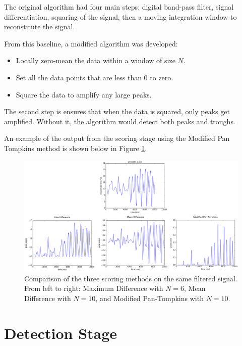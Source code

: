                 The original algorithm had four main steps: digital band-pass filter, signal differentiation, squaring of the signal, then a moving integration window to reconstitute the signal.

                From this baseline, a modified algorithm was developed:

                \begin{itemize}
                    \item Locally zero-mean the data within a window of size $N$.
                    \item Set all the data points that are less than 0 to zero.
                    \item Square the data to amplify any large peaks.
                \end{itemize}

                The second step is ensures that when the data is squared, only peaks get amplified. Without it, the algorithm would detect both peaks and troughs.

                An example of the output from the scoring stage using the Modified Pan Tompkins method is shown below in Figure \ref{img_compare_scoring}.

                \begin{figure}[!th]
                    \includegraphics[width=\textwidth]{Images/compare_scoring.png}
                    \centering
                    \caption{Comparison of the three scoring methods on the same filtered signal. From left to right: Maximum Difference with $N=6$, Mean Difference with $N=10$, and Modified Pan-Tompkins with $N=10$.}
                    \label{img_compare_scoring}
                \end{figure}


        \section{Detection Stage}

